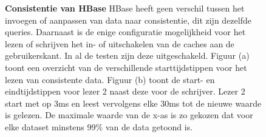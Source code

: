 \begin{figure}[ht!] 
	\centering

	\caption{\textbf{Consistentie van HBase} \newline
	HBase heeft geen verschil tussen het invoegen of aanpassen van data naar consistentie, dit zijn dezelfde queries. Daarnaast is de enige configuratie mogelijkheid voor het lezen of schrijven het in- of uitschakelen van de caches aan de gebruikerskant. In al de testen zijn deze uitgeschakeld.  \newline
	Figuur (a) toont een overzicht van de verschillende starttijdstippen voor het lezen van consistente data. Figuur (b) toont de start- en eindtijdstippen voor lezer 2 naast deze voor de schrijver. Lezer 2 start met op 3ms en leest vervolgens elke 30ms tot de nieuwe waarde is gelezen. De maximale waarde van de x-as is zo gekozen dat voor elke dataset minstens 99\% van de data getoond is. }
	\label{fig:consistentie-hbase}
\end{figure}


